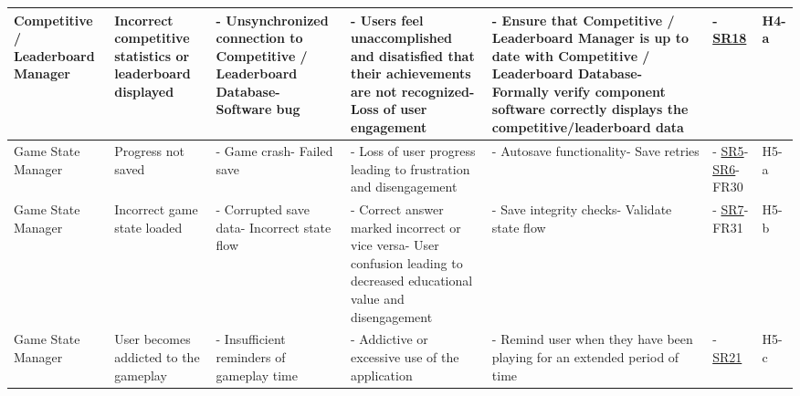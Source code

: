 \documentclass{article}
\begin{document}
\begin{landscape}
\begin{tabularx}{\linewidth}{|P{2.3cm}|Y|Y|Y|Y|P{1.7cm}|P{0.8cm}|}
    \hline

    Competitive / Leaderboard Manager &
    Incorrect competitive statistics or leaderboard displayed &
    - Unsynchronized connection to Competitive / Leaderboard Database\newline- Software bug &
    - Users feel unaccomplished and disatisfied that their achievements are not recognized\newline- Loss of user engagement &
    - Ensure that Competitive / Leaderboard Manager is up to date with Competitive / Leaderboard Database\newline- Formally verify component software correctly displays the competitive/leaderboard data &
    - \hyperref[req:SR18]{SR18} &
    H4-a \\

    \hline

    Game State Manager &
    Progress not saved &
    - Game crash\newline- Failed save &
    - Loss of user progress leading to frustration and disengagement &
    - Autosave functionality\newline- Save retries &
    - \hyperref[req:SR5]{SR5}\newline- \hyperref[req:SR6]{SR6}\newline- FR30 &
    H5-a \\

    \hline

    Game State Manager &
    Incorrect game state loaded &
    - Corrupted save data\newline- Incorrect state flow &
    - Correct answer marked incorrect or vice versa\newline- User confusion leading to decreased educational value and disengagement &
    - Save integrity checks\newline- Validate state flow &
    - \hyperref[req:SR7]{SR7}\newline- FR31 &
    H5-b \\

    \hline

    Game State Manager &
    User becomes addicted to the gameplay &
    - Insufficient reminders of gameplay time &
    - Addictive or excessive use of the application &
    - Remind user when they have been playing for an extended period of time &
    - \hyperref[req:SR21]{SR21} &
    H5-c \\

    \hline


\end{tabularx}
\end{landscape}
\end{document}
